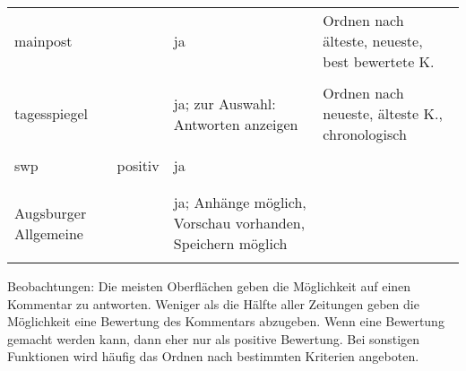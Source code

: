 \begin{landscape}
\begin{longtable}{l|p{40mm}p{40mm}p{80mm}}
  mainpost & & ja & Ordnen nach älteste, neueste, best bewertete K.\\
           & \multicolumn{3}{c}{}\\\hline

  tagesspiegel & & ja; zur Auswahl: Antworten anzeigen &
    Ordnen nach neueste, älteste K., chronologisch\\
    & \multicolumn{3}{c}{}\\\hline

    swp & positiv & ja & \\
        & \multicolumn{3}{c}{}\\\hline \\

    Augsburger Allgemeine &
      & ja; Anhänge möglich, Vorschau vorhanden, Speichern möglich & \\
      & \multicolumn{3}{c}{}\\\hline

\end{longtable}
\end{landscape}

Beobachtungen: Die meisten Oberflächen geben die Möglichkeit auf einen Kommentar
zu antworten. Weniger als die Hälfte aller Zeitungen geben die Möglichkeit eine
Bewertung des Kommentars abzugeben. Wenn eine Bewertung gemacht werden kann,
dann eher nur als positive Bewertung. Bei sonstigen Funktionen wird häufig das
Ordnen nach bestimmten Kriterien angeboten. 

